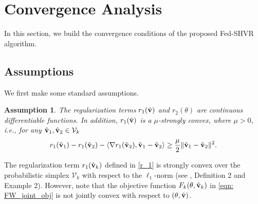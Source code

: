 \documentclass[twoside,journal]{IEEEtran}
\def\VectorFont{\bf}
\newcommand{\vv}{{\VectorFont v}}
\newtheorem{assumption}{Assumption}
\begin{document}
\vspace{-0.2cm}
%
%
%



\section{Convergence Analysis}\label{sec: CA}
In this section, we build the convergence conditions of the proposed Fed-SHVR algorithm.
\subsection{Assumptions}
We first make some standard assumptions.
\begin{assumption}\label{ass: reg}
The regularization terms $r_1(\hat{\vv})$ and $r_2(\theta)$ are continuous differentiable functions. In addition, $r_1(\hat{\vv})$ is a $\mu$-strongly convex, where $\mu>0$, i.e., for any $\hat \vv_1,\hat \vv_2 \in \mathcal{V}_k$
\begin{align}\label{reg_strong}
r_1(\hat{\vv}_1)-r_1(\hat{\vv}_2)-\langle\nabla r_1(\hat{\vv}_2),\hat{\vv}_1-\hat{\vv}_2\rangle \geq \frac{\mu}{2}\|\hat{\vv}_1-\hat{\vv}_2\|^2.
\end{align}
\end{assumption}
 The regularization term $r_1(\hat{\vv}_{k}) $ defined in \eqref{r_1} is strongly convex over the probabilistic simplex $\mathcal{V}_k$ with respect to the $\ell_1$-norm (see \cite{shalev2007logarithmic}, Definition 2 and Example 2). However,  note that the objective function $F_k(\theta,\hat{\vv}_k)$ in \eqref{eqn: FW_joint_obj} is not jointly convex with respect
to  $(\theta,\hat{\vv})$.
\end{document}
